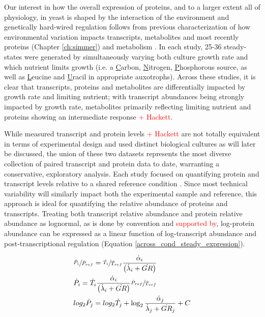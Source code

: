 Our interest in how the overall expression of proteins, and to a larger extent all of physiology, in yeast is shaped by the interaction of the environment and genetically hard-wired regulation follows from previous characterization of how environmental variation impacts transcripts, metabolites and most recently proteins (Chapter \ref{ch:simmer}) and metabolism \cite{Brauer:2008jn, Boer:2010fb}. In each study, 25-36 steady-states were generated by simultaneously varying both culture growth rate and which nutrient limits growth (i.e. a \underline{C}arbon, \underline{N}itrogen, \underline{P}hosphorous source, as well as \underline{L}eucine and \underline{U}racil in appropriate auxotrophs). Across these studies, it is clear that transcripts, proteins and metabolites are differentially impacted by growth rate and limiting nutrient; with transcript abundances being strongly impacted by growth rate, metabolites primarily reflecting limiting nutrient and proteins showing an intermediate response \textcolor{red}{+ Hackett}.

While measured transcript and protein levels \cite{Brauer:2008jn}\textcolor{red}{+ Hackett} are not totally equivalent in terms of experimental design and used distinct biological cultures as will later be discussed, the union of these two datasets represents the most diverse collection of paired transcript and protein data to date, warranting a conservative, exploratory analysis.  Each study focused on quantifying protein and transcript levels relative to a shared reference condition \cite{Quackenbush:2002kl}.  Since most technical variability will similarly impact both the experimental sample and reference, this approach is ideal for quantifying the relative abundance of proteins and transcripts. Treating both transcript relative abundance and protein relative abundance as lognormal, as is done by convention and \textcolor{red}{supported by}, log-protein abundance can be expressed as a linear function of log-transcript abundance and post-transcriptional regulation (Equation \ref{across_cond_steady_expression}).

\begin{align}
&\sfrac{\dot{P}_{i}}{\dot{P}_{ref}} = \sfrac{\dot{T}_{i}}{\dot{T}_{ref}}\frac{\dot{\alpha}_{i}}{\left(\dot{\lambda}_{i} + \dot{GR}\right)}\notag\\
&\dot{P}_{i} = \dot{T}_{i}\frac{\dot{\alpha}_{i}}{\left(\dot{\lambda}_{i} + \dot{GR}\right)}\sfrac{\dot{P}_{ref}}{\dot{T}_{ref}}\notag\\
&log_{2}\dot{P}_{j} = log_{2}\dot{T}_{j} + \log_{2}\frac{\dot{\alpha}_{j}}{\dot{\lambda}_{j} + \dot{GR}_{j}} + C\label{across_cond_steady_expression}
\end{align}

